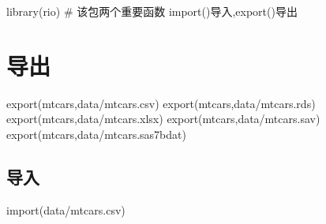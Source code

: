 \documentclass[
  letterpaper,
  DIV=11,
  numbers=noendperiod]{scrreprt}
\newenvironment{Shaded}{\begin{snugshade}}{\end{snugshade}}
\newcommand{\CommentTok}[1]{\textcolor[rgb]{0.37,0.37,0.37}{#1}}
\newcommand{\FunctionTok}[1]{\textcolor[rgb]{0.28,0.35,0.67}{#1}}
\newcommand{\NormalTok}[1]{\textcolor[rgb]{0.00,0.23,0.31}{#1}}
\newcommand{\StringTok}[1]{\textcolor[rgb]{0.13,0.47,0.30}{#1}}
\begin{document}
\begin{Shaded}
\begin{Highlighting}[]
\FunctionTok{library}\NormalTok{(rio)}
\CommentTok{\# 该包两个重要函数 import()导入,export()导出}
\end{Highlighting}
\end{Shaded}

\section{导出}\label{ux5bfcux51fa}

\begin{Shaded}
\begin{Highlighting}[]
\FunctionTok{export}\NormalTok{(mtcars,}\StringTok{\textquotesingle{}data/mtcars.csv\textquotesingle{}}\NormalTok{)}
\FunctionTok{export}\NormalTok{(mtcars,}\StringTok{\textquotesingle{}data/mtcars.rds\textquotesingle{}}\NormalTok{)}
\FunctionTok{export}\NormalTok{(mtcars,}\StringTok{\textquotesingle{}data/mtcars.xlsx\textquotesingle{}}\NormalTok{)}
\FunctionTok{export}\NormalTok{(mtcars,}\StringTok{\textquotesingle{}data/mtcars.sav\textquotesingle{}}\NormalTok{)}
\FunctionTok{export}\NormalTok{(mtcars,}\StringTok{\textquotesingle{}data/mtcars.sas7bdat\textquotesingle{}}\NormalTok{)}
\end{Highlighting}
\end{Shaded}

\subsection{导入}\label{ux5bfcux5165}

\begin{Shaded}
\begin{Highlighting}[]
\FunctionTok{import}\NormalTok{(}\StringTok{\textquotesingle{}data/mtcars.csv\textquotesingle{}}\NormalTok{)}
\end{Highlighting}
\end{Shaded}
\end{document}
